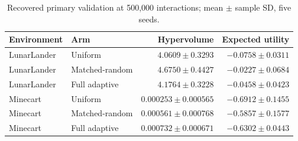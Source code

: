 \begin{table}[htbp]
\centering\small
\caption{Recovered primary validation at 500,000 interactions; mean $\pm$ sample SD, five seeds.}
\label{tab:primary}
\begin{tabular}{llrr}
\toprule
Environment & Arm & Hypervolume & Expected utility\\
\midrule
LunarLander & Uniform & $4.0609\pm0.3293$ & $-0.0758\pm0.0311$\\
LunarLander & Matched-random & $4.6750\pm0.4427$ & $-0.0227\pm0.0684$\\
LunarLander & Full adaptive & $4.1764\pm0.3228$ & $-0.0458\pm0.0423$\\
Minecart & Uniform & $0.000253\pm0.000565$ & $-0.6912\pm0.1455$\\
Minecart & Matched-random & $0.000561\pm0.000768$ & $-0.5857\pm0.1577$\\
Minecart & Full adaptive & $0.000732\pm0.000671$ & $-0.6302\pm0.0443$\\
\bottomrule\end{tabular}\end{table}
